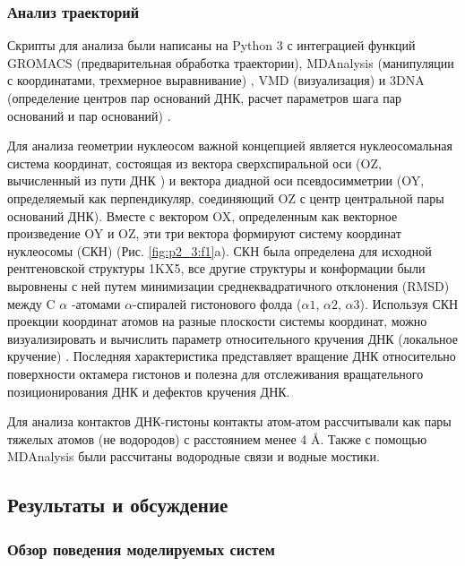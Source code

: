 \subsubsection{Анализ траекторий}
Скрипты для анализа были написаны на Python 3 с интеграцией функций GROMACS (предварительная обработка траектории), MDAnalysis (манипуляции с координатами, трехмерное выравнивание) \cite{michaudagrawal_mdanalysis_2011}, VMD (визуализация) \cite{humphrey_vmd_1996} и 3DNA (определение центров пар оснований ДНК, расчет параметров шага пар оснований и пар оснований) \cite{lu_3dna_2003}.

Для анализа геометрии нуклеосом важной концепцией является нуклеосомальная система координат, состоящая из вектора сверхспиральной оси (OZ, вычисленный из пути ДНК \cite{shaytan_coupling_2016}) и вектора диадной оси псевдосимметрии (OY, определяемый как перпендикуляр, соединяющий OZ с центр центральной пары оснований ДНК). Вместе с вектором OX, определенным как векторное произведение OY и OZ, эти три вектора формируют систему координат нуклеосомы (СКН) (Рис. \ref{fig:p2_3:f1}a). СКН была определена для исходной рентгеновской структуры 1KX5, все другие структуры и конформации были выровнены с ней путем минимизации среднеквадратичного отклонения (RMSD) между C $\alpha$ -атомами $\alpha$-спиралей гистонового фолда ($\alpha1$, $\alpha2$, $\alpha3$). Используя СКН проекции координат атомов на разные плоскости системы координат, можно визуализировать и вычислить параметр относительного кручения ДНК (локальное кручение) \cite{shaytan_hydroxyl-radical_2017}. Последняя характеристика представляет вращение ДНК относительно поверхности октамера гистонов и полезна для отслеживания вращательного позиционирования ДНК и дефектов кручения ДНК.

Для анализа  контактов ДНК-гистоны контакты атом-атом рассчитывали как пары тяжелых атомов (не водородов) с расстоянием менее 4 \AA. Также с помощью MDAnalysis были рассчитаны водородные связи и водные мостики.


\subsection{Результаты и обсуждение}

\subsubsection{Обзор поведения моделируемых систем}

